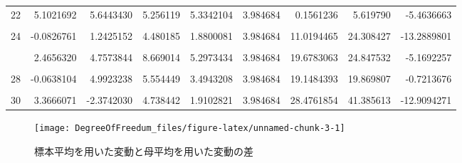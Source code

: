 \documentclass[]{tufte-handout}
\begin{document}
\begin{table}
{\begin{tabular}[t]{rrrrrrrrr}
22 & 5.1021692 & 5.6443430 & 5.256119 & 5.3342104 & 3.984684 & 0.1561236 & 5.619790 & -5.4636663\\
\cellcolor{gray!6}{23} & \cellcolor{gray!6}{5.3166644} & \cellcolor{gray!6}{2.6901232} & \cellcolor{gray!6}{3.610101} & \cellcolor{gray!6}{3.8722960} & \cellcolor{gray!6}{3.984684} & \cellcolor{gray!6}{3.5524790} & \cellcolor{gray!6}{3.590372} & \cellcolor{gray!6}{-0.0378930}\\
24 & -0.0826761 & 1.2425152 & 4.480185 & 1.8800081 & 3.984684 & 11.0194465 & 24.308427 & -13.2889801\\
\cellcolor{gray!6}{25} & \cellcolor{gray!6}{4.9519314} & \cellcolor{gray!6}{7.0017511} & \cellcolor{gray!6}{4.258477} & \cellcolor{gray!6}{5.4040532} & \cellcolor{gray!6}{3.984684} & \cellcolor{gray!6}{4.0693974} & \cellcolor{gray!6}{10.113226} & \cellcolor{gray!6}{-6.0438284}\\
\addlinespace
26 & 2.4656320 & 4.7573844 & 8.669014 & 5.2973434 & 3.984684 & 19.6783063 & 24.847532 & -5.1692257\\
\cellcolor{gray!6}{27} & \cellcolor{gray!6}{6.1788690} & \cellcolor{gray!6}{2.7941764} & \cellcolor{gray!6}{5.130989} & \cellcolor{gray!6}{4.7013448} & \cellcolor{gray!6}{3.984684} & \cellcolor{gray!6}{6.0049633} & \cellcolor{gray!6}{7.545772} & \cellcolor{gray!6}{-1.5408090}\\
28 & -0.0638104 & 4.9923238 & 5.554449 & 3.4943208 & 3.984684 & 19.1484393 & 19.869807 & -0.7213676\\
\cellcolor{gray!6}{29} & \cellcolor{gray!6}{3.5509714} & \cellcolor{gray!6}{0.8846013} & \cellcolor{gray!6}{4.057784} & \cellcolor{gray!6}{2.8311190} & \cellcolor{gray!6}{3.984684} & \cellcolor{gray!6}{5.8118266} & \cellcolor{gray!6}{9.803962} & \cellcolor{gray!6}{-3.9921351}\\
30 & 3.3666071 & -2.3742030 & 4.738442 & 1.9102821 & 3.984684 & 28.4761854 & 41.385613 & -12.9094271\\
\bottomrule
\end{tabular}}
\end{table}

\begin{figure}

{\centering \texttt{[image: DegreeOfFreedum\_files/figure-latex/unnamed-chunk-3-1]} 

}

\caption[標本平均を用いた変動と母平均を用いた変動の差]{標本平均を用いた変動と母平均を用いた変動の差}\label{fig:unnamed-chunk-3}
\end{figure}
\end{document}
